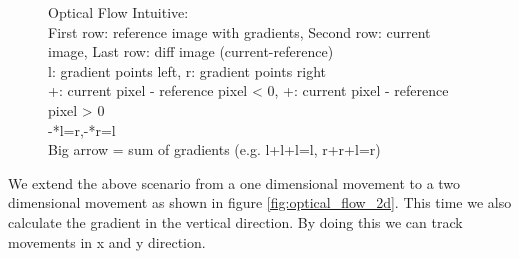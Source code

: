 \documentclass[11pt,a4paper,titlepage,oneside]{report}
\begin{document}
\begin{figure}[H]
	\caption{Optical Flow Intuitive:\\
		First row: reference image with gradients, Second row: current image, Last row:  diff image (current-reference)\\
		l: gradient points left, r: gradient points right\\
		+: current pixel - reference pixel < 0, +: current pixel - reference pixel > 0\\
		-*l=r,-*r=l\\
		Big arrow = sum of gradients (e.g. l+l+l=l, r+r+l=r)
	}\label{fig:optical_flow_intuitive}
\end{figure}

We extend the above scenario from a one dimensional movement to a two dimensional movement as shown in figure \ref{fig:optical_flow_2d}. This time we also calculate the gradient in the vertical direction. By doing this we can track movements in x and y direction.
\end{document}
